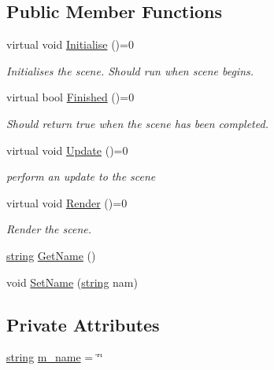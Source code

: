 \subsection*{Public Member Functions}
\begin{DoxyCompactItemize}
\item 
virtual void \hyperlink{class_scene_ac98c97211dd79b25d7c20f400d8fb313}{Initialise} ()=0
\begin{DoxyCompactList}\small\item\em Initialises the scene. Should run when scene begins. \end{DoxyCompactList}\item 
virtual bool \hyperlink{class_scene_ad0e38afbf0bce24e37f1da61f2ea7688}{Finished} ()=0
\begin{DoxyCompactList}\small\item\em Should return true when the scene has been completed. \end{DoxyCompactList}\item 
virtual void \hyperlink{class_scene_ab99ec7aff3ed995985ddb764ffb78f8e}{Update} ()=0
\begin{DoxyCompactList}\small\item\em perform an update to the scene \end{DoxyCompactList}\item 
virtual void \hyperlink{class_scene_ae24d21e12b34839994ad265662ea24d7}{Render} ()=0
\begin{DoxyCompactList}\small\item\em Render the scene. \end{DoxyCompactList}\item 
\hyperlink{_types_8h_ad453f9f71ce1f9153fb748d6bb25e454}{string} \hyperlink{class_scene_abbeb417e2bd7e21bcb4784710f25dda3}{Get\+Name} ()
\item 
void \hyperlink{class_scene_a521d2e8488c5a130ff0ae5d125a61363}{Set\+Name} (\hyperlink{_types_8h_ad453f9f71ce1f9153fb748d6bb25e454}{string} nam)
\end{DoxyCompactItemize}
\subsection*{Private Attributes}
\begin{DoxyCompactItemize}
\item 
\hyperlink{_types_8h_ad453f9f71ce1f9153fb748d6bb25e454}{string} \hyperlink{class_scene_a008f961f890e8cad8ba3f4750470ec11}{m\+\_\+name} = \char`\"{}\char`\"{}
\end{DoxyCompactItemize}


